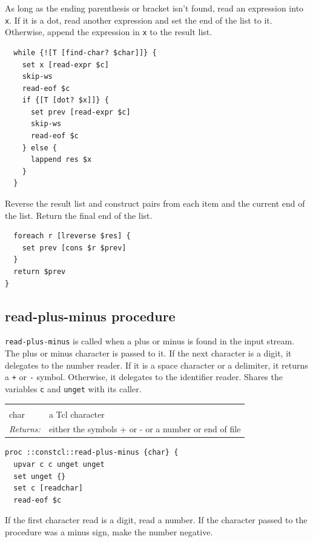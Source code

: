 \documentclass[twoside]{report}
\begin{document}
As long as the ending parenthesis or bracket isn't found, read an expression into \texttt{x}. If it is a dot, read another expression and set the end of the list to it. Otherwise, append the expression in \texttt{x} to the result list.

\begin{lstlisting}
  while {![T [find-char? $char]]} {
    set x [read-expr $c]
    skip-ws
    read-eof $c
    if {[T [dot? $x]]} {
      set prev [read-expr $c]
      skip-ws
      read-eof $c
    } else {
      lappend res $x
    }
  }
\end{lstlisting}

Reverse the result list and construct pairs from each item and the current end of the list. Return the final end of the list.

\begin{lstlisting}
  foreach r [lreverse $res] {
    set prev [cons $r $prev]
  }
  return $prev
}
\end{lstlisting}

\subsection{read-plus-minus procedure}
\label{readplusminus-procedure}

\texttt{read-plus-minus} is called when a plus or minus is found in the input stream. The plus or minus character is passed to it. If the next character is a digit, it delegates to the number reader. If it is a space character or a delimiter, it returns a \texttt{+} or \texttt{-} symbol. Otherwise, it delegates to the identifier reader. Shares the variables \texttt{c} and \texttt{unget} with its caller.

\noindent\begin{tabular}{ |p{1.9cm} p{8cm}| }
\hline
\rowcolor[HTML]{CCCCCC} \multicolumn{2}{|l|}{\bf read-plus-minus (internal)} \\
char & a Tcl character \\
\textit{Returns:} & either the symbols + or - or a number or end of file \\
\hline
\end{tabular}

\begin{lstlisting}
proc ::constcl::read-plus-minus {char} {
  upvar c c unget unget
  set unget {}
  set c [readchar]
  read-eof $c
\end{lstlisting}

If the first character read is a digit, read a number. If the character passed to the procedure was a minus sign, make the number negative.
\end{document}
